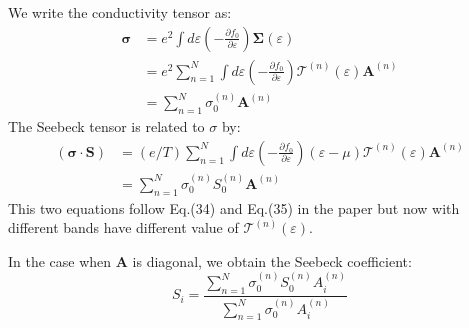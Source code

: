 \documentclass{article}
\newcommand{\pfrac}[2]{\frac{\partial #1}{\partial #2}}
\begin{document}
We write the conductivity tensor as:
\begin{align}
    \mathbf{\sigma} &= e^2\int d\varepsilon \left( -\pfrac{f_0}{\varepsilon} \right) \mathbf{\Sigma}(\varepsilon) \\
            &= e^2 \sum_{n=1}^N \int d\varepsilon \left( -\pfrac{f_0}{\varepsilon} \right) \mathcal{T}^{(n)}(\varepsilon) \mathbf{A}^{(n)} \\
            &= \sum_{n=1}^N \sigma_0^{(n)} \mathbf{A}^{(n)}
\end{align}
The Seebeck tensor is related to $\sigma$ by:
\begin{align}
    \mathbf{(\sigma \cdot S)} &= (e/T) \sum_{n=1}^N \int d\varepsilon 
            \left(-\pfrac{f_0}{\varepsilon}\right)(\varepsilon - \mu) \mathcal{T}^{(n)}(\varepsilon) \mathbf{A}^{(n)} \\
        &= \sum_{n=1}^N \sigma_0^{(n)} S_0^{(n)} \mathbf{A}^{(n)}
\end{align}
This two equations follow Eq.(34) and Eq.(35) in the paper but now with different 
bands have different value of $\mathcal{T}^{(n)}(\varepsilon)$. 

In the case when $\mathbf{A}$ is diagonal, we obtain the Seebeck coefficient:
\begin{equation}
    S_i = \frac{\sum_{n=1}^N \sigma_0^{(n)} S_0^{(n)} A_i^{(n)}}{\sum_{n=1}^N \sigma_0^{(n)} A_i^{(n)}}
\end{equation}
\end{document}
